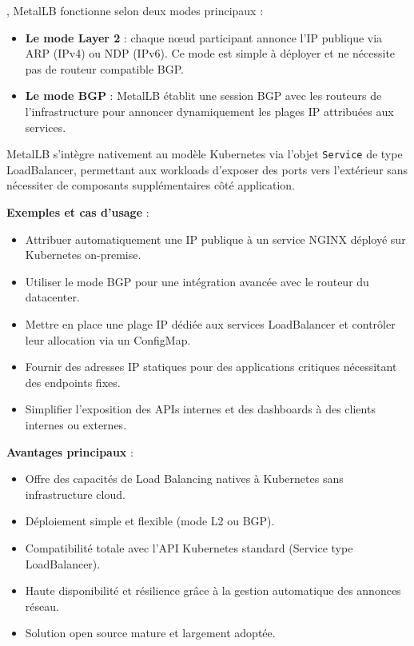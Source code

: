, MetalLB fonctionne selon deux modes principaux :
\begin{itemize}
	\item \textbf{Le mode Layer 2}  : chaque nœud participant annonce l’IP publique via ARP (IPv4) ou NDP (IPv6). Ce mode est simple à déployer et ne nécessite pas de routeur compatible BGP.
	\item \textbf{Le mode BGP}  : MetalLB établit une session BGP avec les routeurs de l’infrastructure pour annoncer dynamiquement les plages IP attribuées aux services.
\end{itemize}

MetalLB s’intègre nativement au modèle Kubernetes via l’objet \texttt{Service} de type LoadBalancer, permettant aux workloads d’exposer des ports vers l’extérieur sans nécessiter de composants supplémentaires côté application.

\textbf{Exemples et cas d’usage} :
\begin{itemize}
	\item Attribuer automatiquement une IP publique à un service NGINX déployé sur Kubernetes on-premise.
	\item Utiliser le mode BGP pour une intégration avancée avec le routeur du datacenter.
	\item Mettre en place une plage IP dédiée aux services LoadBalancer et contrôler leur allocation via un ConfigMap.
	\item Fournir des adresses IP statiques pour des applications critiques nécessitant des endpoints fixes.
	\item Simplifier l’exposition des APIs internes et des dashboards à des clients internes ou externes.
\end{itemize}

\textbf{Avantages principaux} :
\begin{itemize}
	\item Offre des capacités de Load Balancing natives à Kubernetes sans infrastructure cloud.
	\item Déploiement simple et flexible (mode L2 ou BGP).
	\item Compatibilité totale avec l’API Kubernetes standard (Service type LoadBalancer).
	\item Haute disponibilité et résilience grâce à la gestion automatique des annonces réseau.
	\item Solution open source mature et largement adoptée.
\end{itemize}


